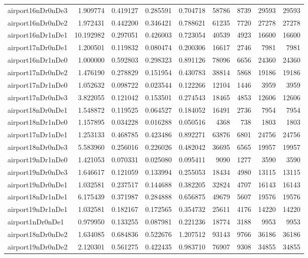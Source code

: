 \documentclass[../../../thesis.tex]{subfiles}
\begin{document}
\begin{longtable}{|l|r|r|r|r|r|r|r|r|}
airport16nDr0nDe3 & 1.909774 & 0.419127 & 0.285591 & 0.704718 & 58786 & 8739 & 29593 & 29593 \\
airport16nDr0nDe2 & 1.972431 & 0.442200 & 0.346421 & 0.788621 & 61235 & 7720 & 27278 & 27278 \\
airport16nDr1nDe1 & 10.192982 & 0.297051 & 0.426003 & 0.723054 & 40539 & 4923 & 16600 & 16600 \\
airport17nDr0nDe1 & 1.200501 & 0.119832 & 0.080474 & 0.200306 & 16617 & 2746 & 7981 & 7981 \\
airport16nDr1nDe0 & 1.000000 & 0.592803 & 0.298323 & 0.891126 & 78096 & 6656 & 24360 & 24360 \\
airport17nDr0nDe2 & 1.476190 & 0.278829 & 0.151954 & 0.430783 & 38814 & 5868 & 19186 & 19186 \\
airport17nDr1nDe0 & 1.052632 & 0.098722 & 0.023544 & 0.122266 & 12104 & 1446 & 3959 & 3959 \\
airport17nDr0nDe3 & 3.822055 & 0.121042 & 0.153501 & 0.274543 & 18465 & 4853 & 12606 & 12606 \\
airport18nDr0nDe1 & 1.548872 & 0.119525 & 0.064527 & 0.184052 & 16491 & 2736 & 7954 & 7954 \\
airport18nDr1nDe0 & 1.157895 & 0.034228 & 0.016288 & 0.050516 & 4368 & 738 & 1803 & 1803 \\
airport17nDr1nDe1 & 1.253133 & 0.468785 & 0.423486 & 0.892271 & 63876 & 6801 & 24756 & 24756 \\
airport18nDr0nDe3 & 5.583960 & 0.256016 & 0.226026 & 0.482042 & 36695 & 6565 & 19957 & 19957 \\
airport19nDr1nDe0 & 1.421053 & 0.070331 & 0.025080 & 0.095411 & 9090 & 1277 & 3590 & 3590 \\
airport19nDr0nDe3 & 1.646617 & 0.121059 & 0.133994 & 0.255053 & 18434 & 4980 & 13115 & 13115 \\
airport19nDr0nDe1 & 1.032581 & 0.237517 & 0.144688 & 0.382205 & 32824 & 4707 & 16143 & 16143 \\
airport18nDr1nDe1 & 6.175439 & 0.371987 & 0.284888 & 0.656875 & 49679 & 5607 & 19576 & 19576 \\
airport19nDr1nDe1 & 1.032581 & 0.182167 & 0.172565 & 0.354732 & 25611 & 4176 & 14220 & 14220 \\
airport1nDr0nDe1 & 0.979950 & 0.133255 & 0.087981 & 0.221236 & 18774 & 3188 & 9953 & 9953 \\
airport18nDr0nDe2 & 1.634085 & 0.684836 & 0.522676 & 1.207512 & 93143 & 9766 & 36186 & 36186 \\
airport19nDr0nDe2 & 2.120301 & 0.561275 & 0.422435 & 0.983710 & 76907 & 9308 & 34855 & 34855 \\

\end{longtable}
\end{document}
